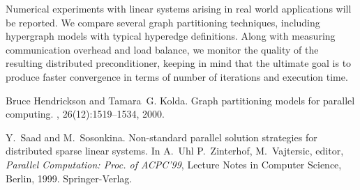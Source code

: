 \documentclass{report}
\begin{document}
Numerical experiments with linear systems arising in real world
applications will be reported. We compare several graph partitioning
techniques, including hypergraph models with typical hyperedge
definitions. Along with measuring communication overhead and load
balance, we monitor the quality of the resulting distributed
preconditioner, keeping in mind that the ultimate goal is to produce
faster convergence in terms of number of iterations and execution
time.

\begin{thebibliography}{1}

Bruce Hendrickson and Tamara~G. Kolda.
\newblock Graph partitioning models for parallel computing.
, 26(12):1519--1534, 2000.

Y.~Saad and M.~Sosonkina.
\newblock Non-standard parallel solution strategies for distributed sparse
linear systems.
\newblock In A.~Uhl P.~Zinterhof, M.~Vajtersic, editor, {\em Parallel
Computation: Proc. of ACPC'99}, Lecture Notes in Computer Science, Berlin,
1999. Springer-Verlag.

\end{thebibliography}
\end{document}
